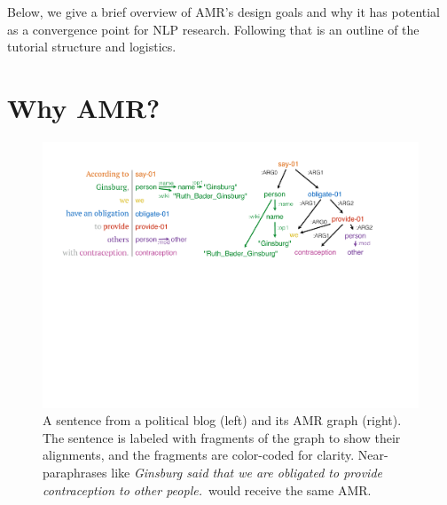 \documentclass[11pt,letterpaper]{article}
\begin{document}
Below, we give a brief overview of AMR's design goals and why it has potential 
as a convergence point for NLP research. 
Following that is an outline of the tutorial structure and logistics.

\section{Why AMR?}


\begin{figure}\centering
\includegraphics[width=.85\textwidth]{ginsburg.pdf}
\caption{A sentence from a political blog (left) and its AMR graph (right).
The sentence is labeled with fragments of the graph to show their alignments, and the fragments are color-coded for clarity.
Near-paraphrases like \textit{Ginsburg said that we are obligated to provide contraception to other people.}\ 
would receive the same AMR.}
\label{fig:ginsburg}
\end{figure}
\end{document}
